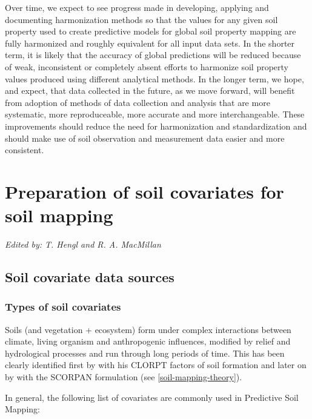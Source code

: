\documentclass[graybox,natbib,nospthms,UStrade]{svmono}
\renewcommand{\hyperlink}[2]{\autoref{#1}}
\begin{document}
Over time, we expect to see progress made in developing, applying and
documenting harmonization methods so that the values for any given soil
property used to create predictive models for global soil property
mapping are fully harmonized and roughly equivalent for all input data
sets. In the shorter term, it is likely that the accuracy of global
predictions will be reduced because of weak, inconsistent or completely
absent efforts to harmonize soil property values produced using
different analytical methods. In the longer term, we hope, and expect,
that data collected in the future, as we move forward, will benefit from
adoption of methods of data collection and analysis that are more
systematic, more reproduceable, more accurate and more interchangeable.
These improvements should reduce the need for harmonization and
standardization and should make use of soil observation and measurement
data easier and more consistent.

\hypertarget{soil-covs-chapter}{%
\chapter{Preparation of soil covariates for soil mapping}\label{soil-covs-chapter}}

\emph{Edited by: T. Hengl and R. A. MacMillan}

\hypertarget{soil-covariate-data-sources}{%
\section{Soil covariate data sources}\label{soil-covariate-data-sources}}

\hypertarget{types-of-soil-covariates}{%
\subsection{Types of soil covariates}\label{types-of-soil-covariates}}

Soils (and vegetation + ecosystem) form under complex interactions between climate, living organism and anthropogenic influences, modified by relief and hydrological processes and run through long periods of time.
This has been clearly identified first by \citet{jenny1994factors} with his CLORPT factors of soil formation and later on by \citet{MCBRATNEY20033} with the SCORPAN formulation (see \protect\hyperlink{soil-mapping-theory}{Introduction chapter}).

In general, the following list of covariates are commonly used in Predictive Soil Mapping:
\end{document}
